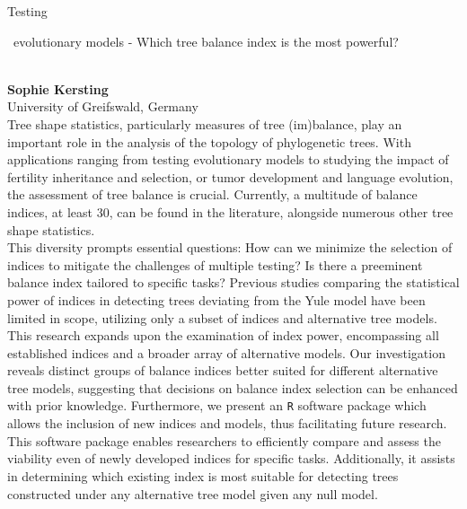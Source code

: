\documentclass[12pt,a4paper]{article}
\newcommand{\ZAbst}{\rule[-1ex]{0pt}{2ex}\ } %
\begin{document}
\bigskip \bigskip  %
\newpage 
\noindent
{\Large Testing\ZAbst evolutionary models - Which tree balance index is the most powerful?}\\[1ex]
{\large 
\textbf{Sophie Kersting}\\[1ex] University of Greifswald, Germany}\\[2ex]
Tree shape statistics, particularly measures of tree (im)balance, play an important role in the analysis of the topology of phylogenetic trees. With applications ranging from testing evolutionary models to studying the impact of fertility inheritance and selection, or tumor development and language evolution, the assessment of tree balance is crucial. Currently, a multitude of balance indices, at least 30, can be found in the literature, alongside numerous other tree shape statistics.
\\
This diversity prompts essential questions: How can we minimize the selection of indices to mitigate the challenges of multiple testing? Is there a preeminent balance index tailored to specific tasks? Previous studies comparing the statistical power of indices in detecting trees deviating from the Yule model have been limited in scope, utilizing only a subset of indices and alternative tree models.
\\
This research expands upon the examination of index power, encompassing all established indices and a broader array of alternative models. Our investigation reveals distinct groups of balance indices better suited for different alternative tree models, suggesting that decisions on balance index selection can be enhanced with prior knowledge. Furthermore, we present an {\tt R} software package which allows the inclusion of new indices and models, thus facilitating future research. This software package enables researchers to efficiently compare and assess the viability even of newly developed indices for specific tasks. Additionally, it assists in determining which existing index is most suitable for detecting trees constructed under any alternative tree model given any null model. 




\bigskip \bigskip  %
\end{document}
